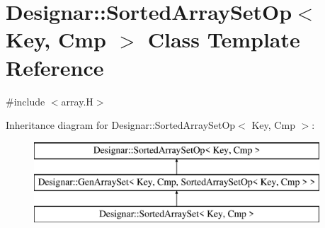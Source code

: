 \hypertarget{class_designar_1_1_sorted_array_set_op}{}\section{Designar\+:\+:Sorted\+Array\+Set\+Op$<$ Key, Cmp $>$ Class Template Reference}
\label{class_designar_1_1_sorted_array_set_op}


{\ttfamily \#include $<$array.\+H$>$}

Inheritance diagram for Designar\+:\+:Sorted\+Array\+Set\+Op$<$ Key, Cmp $>$\+:\begin{figure}[H]
\begin{center}
\leavevmode
\includegraphics[height=3.000000cm]{class_designar_1_1_sorted_array_set_op}
\end{center}
\end{figure}
